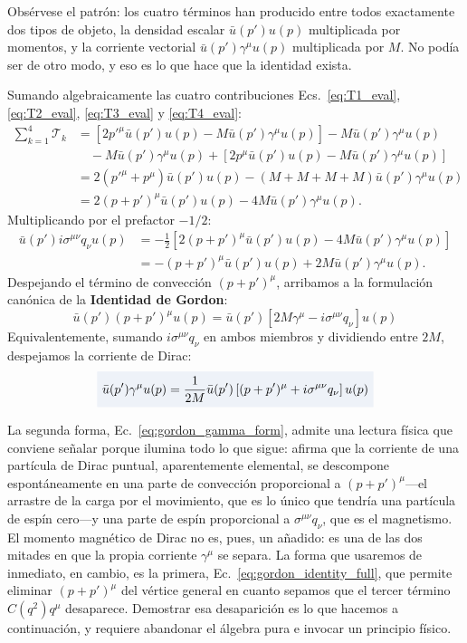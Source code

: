 \documentclass[10pt,a4paper]{article}
\newcommand{\dest}[1]{{\setlength{\fboxsep}{4pt}\colorbox{colordest}{$\displaystyle #1$}}}
\begin{document}
Obsérvese el patrón: los cuatro términos han producido entre todos exactamente dos tipos de objeto, la densidad escalar $\bar{u}(p')u(p)$ multiplicada por momentos, y la corriente vectorial $\bar{u}(p')\gamma^\mu u(p)$ multiplicada por $M$. No podía ser de otro modo, y eso es lo que hace que la identidad exista.

Sumando algebraicamente las cuatro contribuciones Ecs.~\eqref{eq:T1_eval}, \eqref{eq:T2_eval}, \eqref{eq:T3_eval} y \eqref{eq:T4_eval}:
\begin{align}
\sum_{k=1}^4 \mathcal{T}_k &= \left[ 2 p'^\mu \bar{u}(p') u(p) - M \bar{u}(p') \gamma^\mu u(p) \right] - M \bar{u}(p') \gamma^\mu u(p) \nonumber \\
&\quad - M \bar{u}(p') \gamma^\mu u(p) + \left[ 2 p^\mu \bar{u}(p') u(p) - M \bar{u}(p') \gamma^\mu u(p) \right] \nonumber \\
&= 2 (p'^\mu + p^\mu) \bar{u}(p') u(p) - (M + M + M + M) \bar{u}(p') \gamma^\mu u(p) \nonumber \\
&= 2 (p + p')^\mu \bar{u}(p') u(p) - 4 M \bar{u}(p') \gamma^\mu u(p).
\end{align}
Multiplicando por el prefactor $-1/2$:
\begin{align}
\bar{u}(p') i\sigma^{\mu\nu} q_\nu u(p) &= -\frac{1}{2} \left[ 2 (p + p')^\mu \bar{u}(p') u(p) - 4 M \bar{u}(p') \gamma^\mu u(p) \right] \nonumber \\
&= -(p + p')^\mu \bar{u}(p') u(p) + 2M \bar{u}(p') \gamma^\mu u(p).
\end{align}
Despejando el término de convección $(p+p')^\mu$, arribamos a la formulación canónica de la \textbf{Identidad de Gordon}:
\begin{equation}
\boxed{\bar{u}(p') (p + p')^\mu u(p) = \bar{u}(p') \left[ 2M \gamma^\mu - i \sigma^{\mu\nu} q_\nu \right] u(p)}
\label{eq:gordon_identity_full}
\end{equation}
Equivalentemente, sumando $i\sigma^{\mu\nu}q_\nu$ en ambos miembros y dividiendo entre $2M$, despejamos la corriente de Dirac:
\begin{equation}
\dest{\bar{u}(p') \gamma^\mu u(p) = \frac{1}{2M} \bar{u}(p') \left[ (p + p')^\mu + i \sigma^{\mu\nu} q_\nu \right] u(p)}
\label{eq:gordon_gamma_form}
\end{equation}

La segunda forma, Ec.~\eqref{eq:gordon_gamma_form}, admite una lectura física que conviene señalar porque ilumina todo lo que sigue: afirma que la corriente de una partícula de Dirac puntual, aparentemente elemental, se descompone espontáneamente en una parte de convección proporcional a $(p+p')^\mu$---el arrastre de la carga por el movimiento, que es lo único que tendría una partícula de espín cero---y una parte de espín proporcional a $\sigma^{\mu\nu}q_\nu$, que es el magnetismo. El momento magnético de Dirac no es, pues, un añadido: es una de las dos mitades en que la propia corriente $\gamma^\mu$ se separa. La forma que usaremos de inmediato, en cambio, es la primera, Ec.~\eqref{eq:gordon_identity_full}, que permite eliminar $(p+p')^\mu$ del vértice general en cuanto sepamos que el tercer término $C(q^2)q^\mu$ desaparece. Demostrar esa desaparición es lo que hacemos a continuación, y requiere abandonar el álgebra pura e invocar un principio físico.
\end{document}
